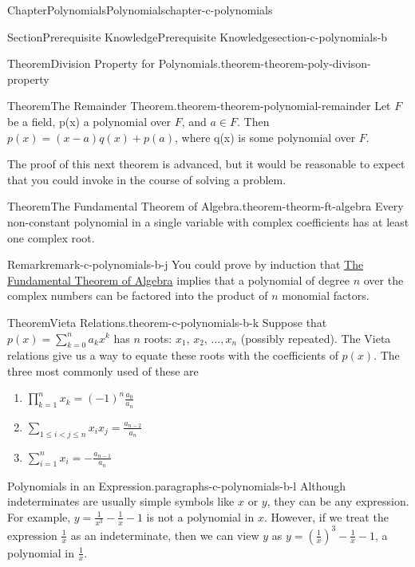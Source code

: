 \documentclass[oneside,10pt,]{book}
\numberwithin{equation}{section}
\newcommand{\lt}{<}
\begin{document}
\begin{chapterptx}{Chapter}{Polynomials}{}{Polynomials}{}{}{chapter-c-polynomials}
\begin{sectionptx}{Section}{Prerequisite Knowledge}{}{Prerequisite Knowledge}{}{}{section-c-polynomials-b}
\begin{theorem}{Theorem}{Division Property for Polynomials.}{}{theorem-theorem-poly-divison-property}
\end{theorem}
\begin{theorem}{Theorem}{The Remainder Theorem.}{}{theorem-theorem-polynomial-remainder}%
%
Let \(F\) be a field, p(x) a polynomial over \(F\), and \(a \in  F\). Then \(p(x) = (x-a)q(x) + p(a)\), where q(x) is some polynomial over \(F\).%
\end{theorem}
The proof of this next theorem is advanced, but it would be reasonable to expect that you could invoke in the course of solving a problem.%
\begin{theorem}{Theorem}{The  Fundamental Theorem of Algebra.}{}{theorem-theorm-ft-algebra}%
%
Every non-constant polynomial in a single variable with complex coefficients has at least one complex root.%
\end{theorem}
\begin{remark}{Remark}{}{remark-c-polynomials-b-j}%
You could prove by induction that \hyperref[theorem-theorm-ft-algebra]{The  Fundamental Theorem of Algebra} implies that a polynomial of degree \(n\) over the complex numbers can be factored into the product of \(n\) monomial factors.%
\end{remark}
\begin{theorem}{Theorem}{Vieta Relations.}{}{theorem-c-polynomials-b-k}%
%
Suppose that  \(p(x) = \sum_{k=0}^n a_k x^k\) has \(n\) roots: \(x_1\), \(x_2\), \(\ldots , x_n\) (possibly repeated).  The Vieta relations give us a way to equate these roots with the coefficients of \(p(x)\). The three most commonly used of these are%
\begin{enumerate}
\item{}\(\displaystyle \prod_{k=1}^n x_k = (-1)^n \frac{a_0}{a_n}\)%
\item{}\(\displaystyle \sum_{1\le i \lt j\le n} x_i x_j = \frac{a_{n-2}}{a_n}\)%
\item{}\(\displaystyle \sum_{i=1}^n x_i = - \frac{a_{n-1}}{a_n}\)%
\end{enumerate}
%
\end{theorem}
\begin{paragraphs}{Polynomials in an Expression.}{paragraphs-c-polynomials-b-l}%
Although indeterminates are usually simple symbols like \(x\) or \(y\), they can be any expression. For example, \(y =\frac{1}{x^3}-\frac{1}{x} -1\) is not a polynomial in \(x\).  However, if we treat the expression \(\frac{1}{x}\) as an indeterminate, then we can view \(y\) as  \(y =(\frac{1}{x})^3-\frac{1}{x} -1\), a polynomial in \(\frac{1}{x}\).%

\end{paragraphs}
\end{sectionptx}
\end{chapterptx}
\end{document}
